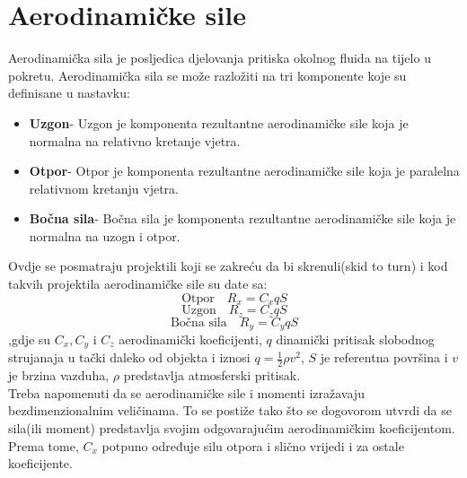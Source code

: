 \section{Aerodinamičke sile}
Aerodinamička sila je posljedica djelovanja pritiska okolnog fluida na tijelo u pokretu. 
Aerodinamička sila se može razložiti na tri komponente koje su definisane u nastavku:
\begin{itemize}
    \item \textbf{Uzgon}- Uzgon je komponenta rezultantne aerodinamičke sile 
    koja je normalna na relativno kretanje vjetra.
    \item \textbf{Otpor}- Otpor je komponenta rezultantne aerodinamičke sile 
    koja je paralelna relativnom kretanju vjetra.
    \item \textbf{Bočna sila}- Bočna sila je komponenta rezultantne aerodinamičke sile 
    koja je normalna na uzogn i otpor. 
\end{itemize}
Ovdje se posmatraju projektili koji se zakreću da bi skrenuli(skid to turn) i 
kod takvih projektila aerodinamičke sile su date sa:
\begin{equation}
   \text{Otpor} \quad R_x=C_xqS
   \label{eq:aa1}
\end{equation}
\begin{equation}
    \text{Uzgon} \quad R_z=C_zqS
    \label{eq:aa2}
\end{equation}
\begin{equation}
    \text{Bočna sila} \quad R_y=C_yqS
    \label{eq:aa3}
\end{equation}
,gdje su $C_x,C_y$ i $C_z$ aerodinamički koeficijenti, $q$ dinamički pritisak slobodnog strujanaja
u tački daleko od objekta i iznosi $q=\frac{1}{2}\rho v^2$, $S$ je referentna površina i 
$v$ je brzina vazduha, $\rho$ predstavlja atmosferski pritisak.
\\
Treba napomenuti da se aerodinamičke sile i momenti izražavaju bezdimenzionalnim veličinama. 
To se postiže tako što se dogovorom utvrdi da se sila(ili moment) predstavlja svojim odgovarajućim 
aerodinamičkim koeficijentom. Prema tome, $C_x$ potpuno određuje silu otpora i slično vrijedi i 
za ostale koeficijente. \\


